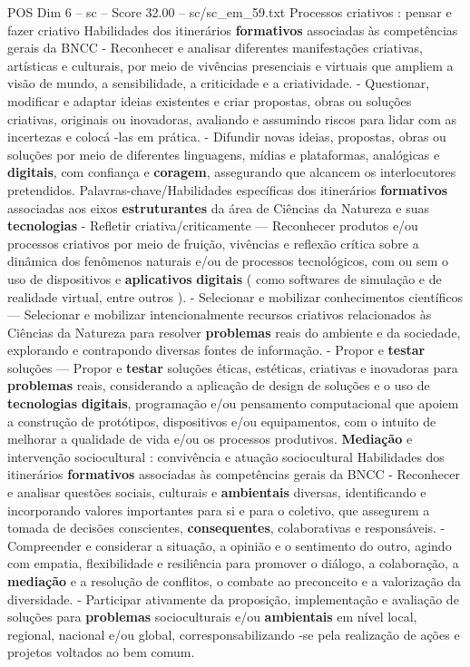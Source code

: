 \begin{textsample}{POS Dim 6 – sc – Score 32.00 – sc/sc\_em\_59.txt}
Processos criativos : pensar e fazer criativo Habilidades dos itinerários \textbf{formativos} associadas às competências gerais da BNCC - Reconhecer e analisar diferentes manifestações criativas, artísticas e culturais, por meio de vivências presenciais e virtuais que ampliem a visão de mundo, a sensibilidade, a criticidade e a criatividade. - Questionar, modificar e adaptar ideias existentes e criar propostas, obras ou soluções criativas, originais ou inovadoras, avaliando e assumindo riscos para lidar com as incertezas e colocá -las em prática. - Difundir novas ideias, propostas, obras ou soluções por meio de diferentes linguagens, mídias e plataformas, analógicas e \textbf{digitais}, com confiança e \textbf{coragem}, assegurando que alcancem os interlocutores pretendidos.
Palavras-chave/Habilidades específicas dos itinerários \textbf{formativos} associadas aos eixos \textbf{estruturantes} da área de Ciências da Natureza e suas \textbf{tecnologias} - Refletir criativa/criticamente — Reconhecer produtos e/ou processos criativos por meio de fruição, vivências e reflexão crítica sobre a dinâmica dos fenômenos naturais e/ou de processos tecnológicos, com ou sem o uso de dispositivos e \textbf{aplicativos} \textbf{digitais} ( como softwares de simulação e de realidade virtual, entre outros ). - Selecionar e mobilizar conhecimentos científicos — Selecionar e mobilizar intencionalmente recursos criativos relacionados às Ciências da Natureza para resolver \textbf{problemas} reais do ambiente e da sociedade, explorando e contrapondo diversas fontes de informação. - Propor e \textbf{testar} soluções — Propor e \textbf{testar} soluções éticas, estéticas, criativas e inovadoras para \textbf{problemas} reais, considerando a aplicação de design de soluções e o uso de \textbf{tecnologias} \textbf{digitais}, programação e/ou pensamento computacional que apoiem a construção de protótipos, dispositivos e/ou equipamentos, com o intuito de melhorar a qualidade de vida e/ou os processos produtivos. \textbf{Mediação} e intervenção sociocultural : convivência e atuação sociocultural Habilidades dos itinerários \textbf{formativos} associadas às competências gerais da BNCC - Reconhecer e analisar questões sociais, culturais e \textbf{ambientais} diversas, identificando e incorporando valores importantes para si e para o coletivo, que assegurem a tomada de decisões conscientes, \textbf{consequentes}, colaborativas e responsáveis. - Compreender e considerar a situação, a opinião e o sentimento do outro, agindo com empatia, flexibilidade e resiliência para promover o diálogo, a colaboração, a \textbf{mediação} e a resolução de conflitos, o combate ao preconceito e a valorização da diversidade. - Participar ativamente da proposição, implementação e avaliação de soluções para \textbf{problemas} socioculturais e/ou \textbf{ambientais} em nível local, regional, nacional e/ou global, corresponsabilizando -se pela realização de ações e projetos voltados ao bem comum.

\end{textsample}
